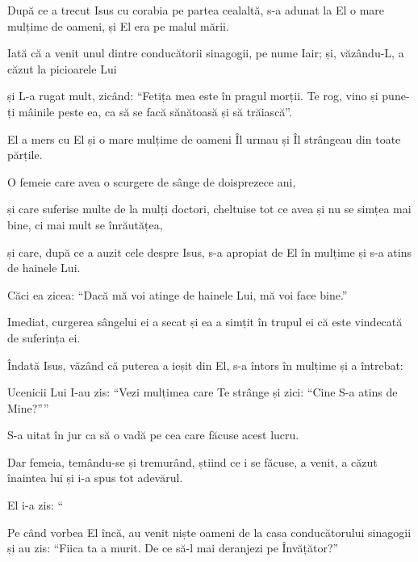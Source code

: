 {\par }{\PP {}După ce a trecut Isus cu corabia pe partea cealaltă, s-a adunat la El o mare mulțime de oameni, și El era pe malul mării.

Iată că a venit unul dintre conducătorii sinagogii, pe nume Iair; și, văzându-L, a căzut la picioarele Lui

și L-a rugat mult, zicând: “Fetița mea este în pragul morții. Te rog, vino și pune-ți mâinile peste ea, ca să se facă sănătoasă și să trăiască”.


\par }{\PP {}El a mers cu El și o mare mulțime de oameni Îl urmau și Îl strângeau din toate părțile.

O femeie care avea o scurgere de sânge de doisprezece ani,

și care suferise multe de la mulți doctori, cheltuise tot ce avea și nu se simțea mai bine, ci mai mult se înrăutățea,

și care, după ce a auzit cele despre Isus, s-a apropiat de El în mulțime și s-a atins de hainele Lui.

Căci ea zicea: “Dacă mă voi atinge de hainele Lui, mă voi face bine.”

Imediat, curgerea sângelui ei a secat și ea a simțit în trupul ei că este vindecată de suferința ei.


\par }{\PP {}Îndată Isus, văzând că puterea a ieșit din El, s-a întors în mulțime și a întrebat:
{}


\par }{\PP {}Ucenicii Lui I-au zis: “Vezi mulțimea care Te strânge și zici: “Cine S-a atins de Mine?””


\par }{\PP {}S-a uitat în jur ca să o vadă pe cea care făcuse acest lucru.

Dar femeia, temându-se și tremurând, știind ce i se făcuse, a venit, a căzut înaintea lui și i-a spus tot adevărul.


\par }{\PP {}El i-a zis: “{}


\par }{\PP {}Pe când vorbea El încă, au venit niște oameni de la casa conducătorului sinagogii și au zis: “Fiica ta a murit. De ce să-l mai deranjezi pe Învățător?”


}
